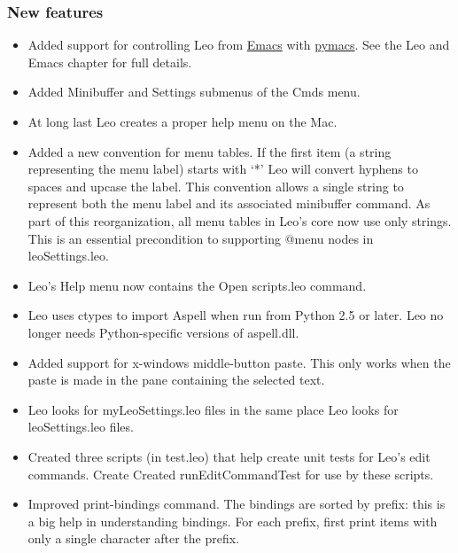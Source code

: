\documentclass[a4paper,10pt,english]{sphinxmanual}
\begin{document}
\subsubsection{New features}
\label{what-is-new:id19}\begin{itemize}
\item {} 
Added support for controlling Leo from \href{http://www.xemacs.org/}{Emacs} with \href{http://pymacs.progiciels-bpi.ca/index.html}{pymacs}.
See the Leo and Emacs chapter for full details.

\item {} 
Added Minibuffer and Settings submenus of the Cmds menu.

\item {} 
At long last Leo creates a proper help menu on the Mac.

\item {} 
Added a new convention for menu tables. If the first item (a string
representing the menu label) starts with `*' Leo will convert hyphens to
spaces and upcase the label. This convention allows a single string to
represent both the menu label and its associated minibuffer command. As part
of this reorganization, all menu tables in Leo's core now use only strings.
This is an essential precondition to supporting @menu nodes in
leoSettings.leo.

\item {} 
Leo's Help menu now contains the Open scripts.leo command.

\item {} 
Leo uses ctypes to import Aspell when run from Python 2.5 or later.
Leo no longer needs Python-specific versions of aspell.dll.

\item {} 
Added support for x-windows middle-button paste.
This only works when the paste is made in the pane containing the selected text.

\item {} 
Leo looks for myLeoSettings.leo files in the same place Leo looks for leoSettings.leo files.

\item {} 
Created three scripts (in test.leo) that help create unit tests for Leo's edit commands.
Create Created runEditCommandTest for use by these scripts.

\item {} 
Improved print-bindings command.
The bindings are sorted by prefix: this is a big help in understanding bindings.
For each prefix, first print items with only a single character after the prefix.


\end{itemize}
\end{document}
